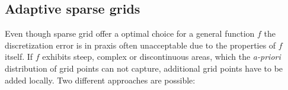 \subsection{Adaptive sparse grids}

Even though sparse grid offer a optimal choice for a general function $f$
the discretization error is in praxis often unacceptable due to
the properties of $f$ itself. If $f$ exhibits steep, complex
or discontinuous areas, which the \emph{a-priori} distribution of grid points
can not capture, additional grid points have to be added locally.
Two different approaches are possible: \\

